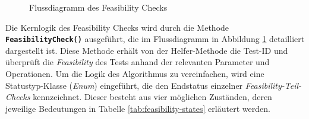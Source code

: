 \begin{figure}[!htbp]
    \centering
    \caption{Flussdiagramm des Feasibility Checks}
    \label{fig:feasibility-check}
\end{figure}

Die Kernlogik des Feasibility Checks wird durch die Methode \textbf{\texttt{FeasibilityCheck()}} ausgeführt, die im Flussdiagramm in Abbildung \ref{fig:feasibility-check} detailliert dargestellt ist. Diese Methode erhält von der Helfer-Methode die Test-ID und überprüft die \textit{Feasibility} des Tests anhand der relevanten Parameter und Operationen. Um die Logik des Algorithmus zu vereinfachen, wird eine Statustyp-Klasse (\textit{Enum}) eingeführt, die den Endstatus einzelner \textit{Feasibility-Teil-Checks} kennzeichnet. Dieser besteht aus vier möglichen Zuständen, deren jeweilige Bedeutungen in Tabelle \ref{tab:feasibility-states} erläutert werden.

